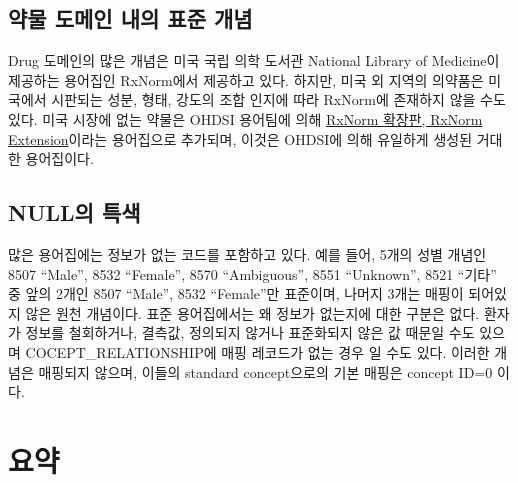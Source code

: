 \documentclass[10.5pt]{book}
\theoremstyle{definition}
\theoremstyle{definition}
\theoremstyle{definition}
\theoremstyle{remark}
\begin{document}
\subsection{약물 도메인 내의 표준 개념}\label{rxNormExtension}

Drug 도메인의 많은 개념은 미국 국립 의학 도서관 National Library of
Medicine이 제공하는 용어집인 RxNorm에서 제공하고 있다. 하지만, 미국 외
지역의 의약품은 미국에서 시판되는 성분, 형태, 강도의 조합 인지에 따라
RxNorm에 존재하지 않을 수도 있다. 미국 시장에 없는 약물은 OHDSI 용어팀에
의해
\href{https://www.ohdsi.org/web/wiki/doku.php?id=documentation:vocabulary:rxnorm_extension}{RxNorm
확장판, RxNorm Extension}이라는 용어집으로 추가되며, 이것은 OHDSI에 의해
유일하게 생성된 거대한 용어집이다.

\subsection{NULL의 특색}\label{null-}

많은 용어집에는 정보가 없는 코드를 포함하고 있다. 예를 들어, 5개의 성별
개념인 8507 ``Male'', 8532 ``Female'', 8570 ``Ambiguous'', 8551
``Unknown'', 8521 ``기타'' 중 앞의 2개인 8507 ``Male'', 8532
``Female''만 표준이며, 나머지 3개는 매핑이 되어있지 않은 원천 개념이다.
표준 용어집에서는 왜 정보가 없는지에 대한 구분은 없다. 환자가 정보를
철회하거나, 결측값, 정의되지 않거나 표준화되지 않은 값 때문일 수도
있으며 COCEPT\_RELATIONSHIP에 매핑 레코드가 없는 경우 일 수도 있다.
이러한 개념은 매핑되지 않으며, 이들의 standard concept으로의 기본 매핑은
concept ID=0 이다.

\section{요약}\label{-3}
\end{document}

